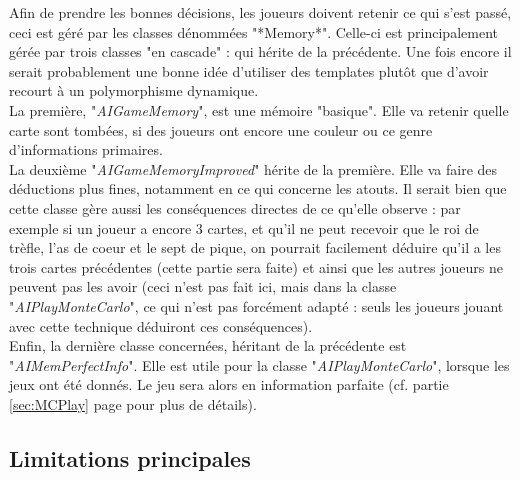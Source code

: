 \documentclass[a4paper,11pt]{article}
\begin{document}
Afin de prendre les bonnes décisions, les joueurs doivent retenir ce qui s'est passé, ceci est géré par les classes dénommées "*Memory*". Celle-ci est principalement gérée par trois classes "en cascade" : qui hérite de la précédente. Une fois encore il serait probablement une bonne idée d'utiliser des templates plutôt que d'avoir recourt à un polymorphisme dynamique.\\
La première, "\textit{AIGameMemory}", est une mémoire "basique". Elle va retenir quelle carte sont tombées, si des joueurs ont encore une couleur ou ce genre d'informations primaires. \\
La deuxième "\textit{AIGameMemoryImproved}" hérite de la première. Elle va faire des déductions plus fines, notamment en ce qui concerne les atouts. Il serait bien que cette classe gère aussi les conséquences directes de ce qu'elle observe  : par exemple si un joueur a encore 3 cartes, et qu'il ne peut recevoir que le roi de trèfle, l'as de coeur et le sept de pique, on pourrait facilement déduire qu'il a les trois cartes précédentes (cette partie sera faite) et ainsi que les autres joueurs ne peuvent pas les avoir (ceci n'est pas fait ici, mais dans la classe "\textit{AIPlayMonteCarlo}", ce qui n'est pas forcément adapté : seuls les joueurs jouant avec cette technique déduiront ces conséquences). \\
Enfin, la dernière classe concernées, héritant de la précédente est "\textit{AIMemPerfectInfo}". Elle est utile pour la classe "\textit{AIPlayMonteCarlo}", lorsque les jeux ont été donnés. Le jeu sera alors en information parfaite (cf. partie \ref{sec:MCPlay} page \pageref{sec:MCPlay} pour plus de détails).

\subsection{Limitations principales}
\end{document}

